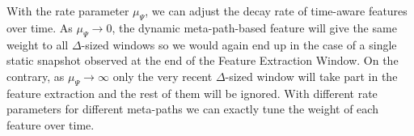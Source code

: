 With the rate parameter $\mu_\Psi$, we can adjust the decay rate of time-aware features over time. As $\mu_\Psi\rightarrow 0$, the dynamic meta-path-based feature will give the same weight to all $\Delta$-sized windows so we would again end up in the case of a single static snapshot observed at the end of the Feature Extraction Window. On the contrary, as $\mu_\Psi\rightarrow\infty$ only the very recent $\Delta$-sized window will take part in the feature extraction and the rest of them will be ignored. With different rate parameters for different meta-paths we can exactly tune the weight of each feature over time.


